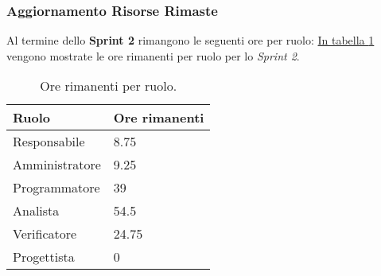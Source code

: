 \subsubsection{Aggiornamento Risorse Rimaste}
\label{sec:AggiornamentoRisorse_Sprint2}
Al termine dello \textbf{Sprint 2} rimangono le seguenti ore per ruolo: \hyperref[tab:sprint2_ore_rimanenti]{In tabella \ref{tab:sprint2_ore_rimanenti}} vengono mostrate le ore rimanenti per ruolo per lo \textit{Sprint 2}.

\begin{table}[H]
    \centering
    \begin{tabular}{| l | l |}
    \hline
    \textbf{Ruolo} & 
    \textbf{Ore rimanenti}\\
    \hline
        Responsabile & 8.75\\
    \hline
        Amministratore & 9.25\\
    \hline
        Programmatore & 39\\
    \hline
        Analista & 54.5\\
    \hline
        Verificatore & 24.75 \\
    \hline
        Progettista & 0\\
    \hline
    \end{tabular}
    \caption{Ore rimanenti per ruolo.}
    \label{tab:sprint2_ore_rimanenti} 
\end{table}